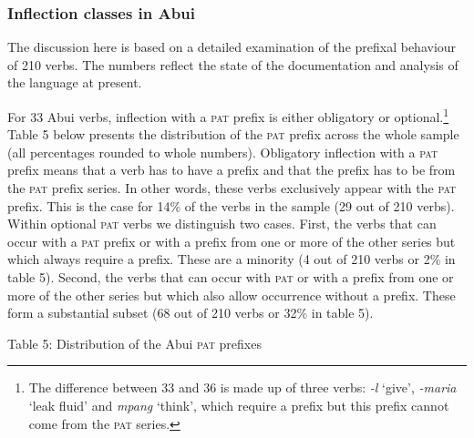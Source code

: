 \subsubsection[Inflection classes in Abui]{\bfseries Inflection classes in Abui}
The discussion here is based on a detailed examination of the prefixal behaviour of 210 verbs. The numbers reflect the state of the documentation and analysis of the language at present. 

For 33 Abui verbs, inflection with a \textsc{pat} prefix is either obligatory or optional.\footnote{The difference between 33 and 36 is made up of three verbs: \textit{{}-l} {\textquoteleft}give{\textquoteright}, \textit{{}-maria} {\textquoteleft}leak fluid{\textquoteright} and \textit{mpang} {\textquoteleft}think{\textquoteright}, which require a prefix but this prefix cannot come from the \textsc{pat} series.} Table 5 below presents the distribution of the \textsc{pat} prefix across the whole sample (all percentages rounded to whole numbers). Obligatory inflection with a \textsc{pat} prefix means that a verb has to have a prefix and that the prefix has to be from the \textsc{pat} prefix series. In other words, these verbs exclusively appear with the \textsc{pat} prefix. This is the case for 14\% of the verbs in the sample (29 out of 210 verbs). Within optional \textsc{pat} verbs we distinguish two cases. First, the verbs that can occur with a \textsc{pat} prefix or with a prefix from one or more of the 
other series but which always require a prefix. These are a minority (4 out of 210 verbs or 2\% in table 5). Second, the verbs that can occur with \textsc{pat} or with a prefix from one or more of the other series but which also allow occurrence without a prefix. These form a substantial subset (68 out of 210 verbs or 32\% in table 5).

Table 5: Distribution of the Abui \textsc{pat} prefixes

